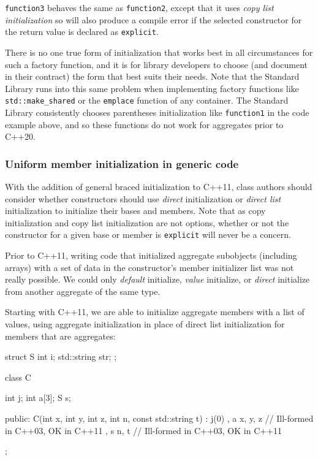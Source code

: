 \lstinline!function3! behaves the same as \lstinline!function2!, except that
it uses \emph{copy list initialization} so will also produce a compile
error if the selected constructor for the return value is declared as
\lstinline!explicit!.

There is no one true form of initialization that works best in all
circumstances for such a factory function, and it is for library
developers to choose (and document in their contract) the form that best
suits their needs. Note that the Standard Library runs into this same
problem when implementing factory functions like
\lstinline!std::make_shared! or the \lstinline!emplace! function of any
container. The Standard Library consistently chooses parentheses
initialization like \lstinline!function1! in the code example above, and so
these functions do not work for aggregates prior to C++20.

\subsubsection[Uniform member initialization in generic code]{Uniform member initialization in generic code}\label{uniform-member-initialization-in-generic-code}

With the addition of general braced initialization to C++11, class
authors should consider whether constructors should use \emph{direct}
initialization or \emph{direct list} initialization to initialize their
bases and members. Note that as copy initialization and copy list
initialization are not options, whether or not the constructor for a
given base or member is \lstinline!explicit! will never be a concern.

Prior to C++11, writing code that initialized aggregate subobjects
(including arrays) with a set of data in the constructor's member
initializer list was not really possible. We could only \emph{default}
initialize, \emph{value} initialize, or \emph{direct} initialize from
another aggregate of the same type.

Starting with C++11, we are able to initialize aggregate members with a
list of values, using aggregate initialization in place of direct list
initialization for members that are aggregates:

\begin{emcppslisting}
struct S
{
    int         i;
    std::string str;
};

class C
{
    int j;
    int a[3];
    S   s;

public:
    C(int x, int y, int z, int n, const std::string t)
    : j(0)
    , a{ x, y, z }  // Ill-formed in C++03, OK in C++11
    , s{ n, t }     // Ill-formed in C++03, OK in C++11
    {
    }
};
\end{emcppslisting}


